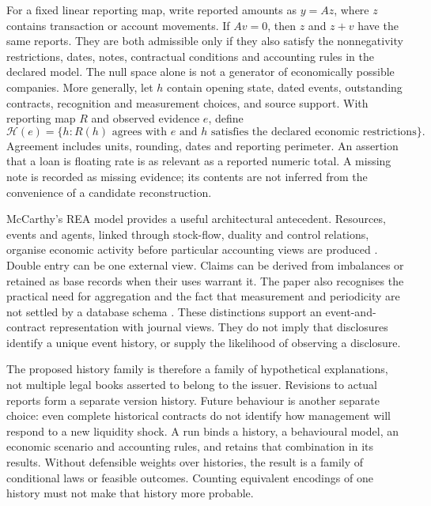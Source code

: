 \documentclass[11pt,a4paper]{article}
\begin{document}
For a fixed linear reporting map, write reported amounts as $y=Az$, where $z$
contains transaction or account movements. If $Av=0$, then $z$ and $z+v$ have
the same reports. They are both admissible only if they also satisfy the
nonnegativity restrictions, dates, notes, contractual conditions and accounting
rules in the declared model. The null space alone is not a generator of
economically possible companies. More generally, let $h$ contain opening state,
dated events, outstanding contracts, recognition and measurement choices, and
source support. With reporting map $R$ and observed evidence $e$, define
\begin{equation}
\mathcal H(e)=\{h:R(h)\text{ agrees with }e
\text{ and }h\text{ satisfies the declared economic restrictions}\}.
\end{equation}
Agreement includes units, rounding, dates and reporting perimeter. An assertion
that a loan is floating rate is as relevant as a reported numeric total. A
missing note is recorded as missing evidence; its contents are not inferred
from the convenience of a candidate reconstruction.

McCarthy's REA model provides a useful architectural antecedent. Resources,
events and agents, linked through stock-flow, duality and control relations,
organise economic activity before particular accounting views are produced
\cite[pp.~560--570]{mccarthy}. Double entry can be one external view. Claims
can be derived from imbalances or retained as base records when their uses
warrant it. The paper also recognises the practical need for aggregation and
the fact that measurement and periodicity are not settled by a database schema
\cite[pp.~568--576]{mccarthy}. These distinctions support an event-and-contract
representation with journal views. They do not imply that disclosures identify
a unique event history, or supply the likelihood of observing a disclosure.

The proposed history family is therefore a family of hypothetical explanations,
not multiple legal books asserted to belong to the issuer. Revisions to actual
reports form a separate version history. Future behaviour is another separate
choice: even complete historical contracts do not identify how management will
respond to a new liquidity shock. A run binds a history, a behavioural model,
an economic scenario and accounting rules, and retains that combination in its
results. Without defensible weights over histories, the result is a family of
conditional laws or feasible outcomes. Counting equivalent encodings of one
history must not make that history more probable.
\end{document}
